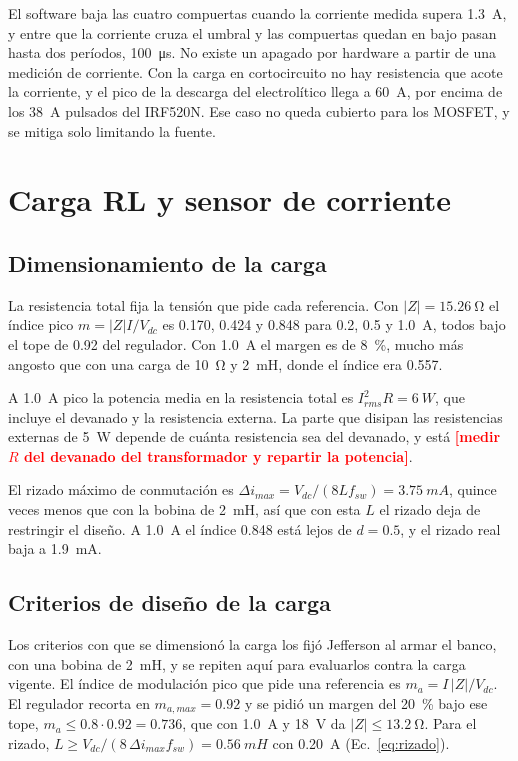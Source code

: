 \documentclass[journal]{IEEEtran}
\newcommand{\pendiente}[1]{\textcolor{red}{\textbf{[#1]}}}
\begin{document}
El software baja las cuatro compuertas cuando la corriente medida supera \SI{1.3}{A}, y entre que la corriente cruza el umbral y las compuertas quedan en bajo pasan hasta dos períodos, \SI{100}{\micro s}. No existe un apagado por hardware a partir de una medición de corriente. Con la carga en cortocircuito no hay resistencia que acote la corriente, y el pico de la descarga del electrolítico llega a \SI{60}{A}, por encima de los \SI{38}{A} pulsados del IRF520N. Ese caso no queda cubierto para los MOSFET, y se mitiga solo limitando la fuente.

\section{Carga RL y sensor de corriente}
\label{sec:carga}

\subsection{Dimensionamiento de la carga}
\label{sec:dim}
La resistencia total fija la tensión que pide cada referencia. Con $|Z|=\SI{15.26}{\ohm}$ el índice pico $m=|Z|I/V_{dc}$ es \num{0.170}, \num{0.424} y \num{0.848} para \num{0.2}, \num{0.5} y \SI{1.0}{A}, todos bajo el tope de \num{0.92} del regulador. Con \SI{1.0}{A} el margen es de \SI{8}{\percent}, mucho más angosto que con una carga de \SI{10}{\ohm} y \SI{2}{mH}, donde el índice era \num{0.557}.

A \SI{1.0}{A} pico la potencia media en la resistencia total es $I_{rms}^2R=\SI{6}{W}$, que incluye el devanado y la resistencia externa. La parte que disipan las resistencias externas de \SI{5}{W} depende de cuánta resistencia sea del devanado, y está \pendiente{medir $R$ del devanado del transformador y repartir la potencia}.

El rizado máximo de conmutación es $\Delta i_{max}=V_{dc}/(8Lf_{sw})=\SI{3.75}{mA}$, quince veces menos que con la bobina de \SI{2}{mH}, así que con esta $L$ el rizado deja de restringir el diseño. A \SI{1.0}{A} el índice \num{0.848} está lejos de $d=0.5$, y el rizado real baja a \SI{1.9}{mA}.

\subsection{Criterios de diseño de la carga}
\label{sec:criterios}
Los criterios con que se dimensionó la carga los fijó Jefferson al armar el banco, con una bobina de \SI{2}{mH}, y se repiten aquí para evaluarlos contra la carga vigente. El índice de modulación pico que pide una referencia es $m_a=I\,|Z|/V_{dc}$. El regulador recorta en $m_{a,max}=0.92$ y se pidió un margen del \SI{20}{\percent} bajo ese tope, $m_a\le0.8\cdot0.92=0.736$, que con \SI{1.0}{A} y \SI{18}{V} da $|Z|\le\SI{13.2}{\ohm}$. Para el rizado, $L\ge V_{dc}/(8\,\Delta i_{max}f_{sw})=\SI{0.56}{mH}$ con \SI{0.20}{A} (Ec.~\ref{eq:rizado}).
\end{document}
